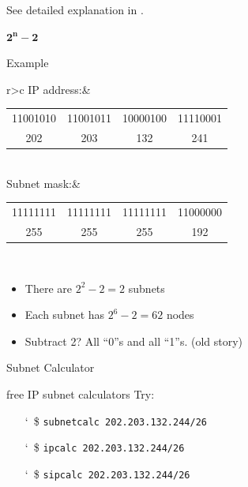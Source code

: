 See detailed explanation in .

\begin{frame}{$\mathbf{2^n-2}$}
  \begin{block}{Example}
    \begin{tabular}{r>{\ttfamily}c}\toprule
      IP address:&\begin{tabular}{c@{.}c@{.}c@{.}c}
                    11001010&11001011&10000100&11110001\\
                    202&203&132&241
                  \end{tabular}\\\midrule
      Subnet mask:&\begin{tabular}{c@{.}c@{.}c@{.}c}
                     11111111&11111111&11111111&11000000\\
                     255&255&255&192
                   \end{tabular}\\\bottomrule
    \end{tabular}
  \end{block}

  \begin{itemize}
  \item There are $2^2-2 = 2$ subnets
  \item Each subnet has $2^6-2 = 62$ nodes
  \item Subtract 2? All ``0''s and all ``1''s. (old story)
  \end{itemize}
\end{frame}

\begin{frame}{Subnet Calculator}
  \begin{block}{free IP subnet calculators}
    Try:
    \begin{itemize}
    \item[\char`~\$]  \texttt{subnetcalc 202.203.132.244/26}
    \item[\char`~\$]  \texttt{ipcalc 202.203.132.244/26}
    \item[\char`~\$]  \texttt{sipcalc 202.203.132.244/26}
    \end{itemize}
  \end{block}
\end{frame}

